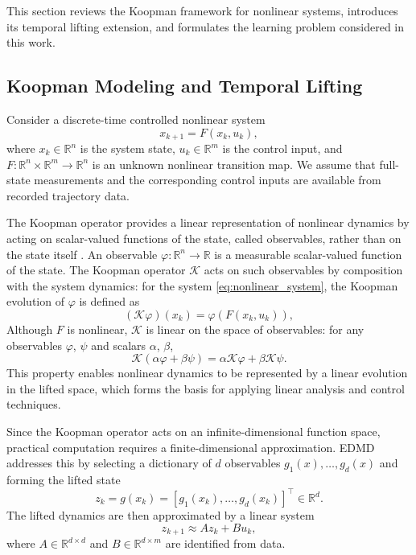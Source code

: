 \documentclass[journal]{IEEEtran}
\begin{document}
This section reviews the Koopman framework for nonlinear systems, introduces its temporal lifting extension, and formulates the learning problem considered in this work.

\subsection{Koopman Modeling and Temporal Lifting}
\label{sec:preliminary}

Consider a discrete-time controlled nonlinear system
\begin{equation}
    x_{k+1} = F(x_k, u_k),
    \label{eq:nonlinear_system}
\end{equation}
where $x_k \in \mathbb{R}^n$ is the system state, $u_k \in \mathbb{R}^m$ is the control input, and $F:\mathbb{R}^n \times \mathbb{R}^m \to \mathbb{R}^n$ is an unknown nonlinear transition map. We assume that full-state measurements and the corresponding control inputs are available from recorded trajectory data.

The Koopman operator provides a linear representation of nonlinear dynamics by acting on scalar-valued functions of the state, called observables, rather than on the state itself \cite{koopman1931hamiltonian, mezic2005spectral, rowley2009spectral, brunton2022modern}. An observable $\varphi:\mathbb{R}^n\to\mathbb{R}$ is a measurable scalar-valued function of the state. The Koopman operator $\mathcal{K}$ acts on such observables by composition with the system dynamics: for the system \eqref{eq:nonlinear_system}, the Koopman evolution of $\varphi$ is defined as
\begin{equation}
    (\mathcal{K}\varphi)(x_k) = \varphi(F(x_k,u_k)),
    \label{eq:koopman_operator}
\end{equation}
Although $F$ is nonlinear, $\mathcal{K}$ is linear on the space of observables: for any observables $\varphi$, $\psi$ and scalars $\alpha$, $\beta$,
\begin{equation}
    \mathcal{K}(\alpha \varphi + \beta \psi)
    = \alpha \mathcal{K}\varphi + \beta \mathcal{K}\psi.
    \label{eq:koopman_linearity}
\end{equation}
This property enables nonlinear dynamics to be represented by a linear evolution in the lifted space, which forms the basis for applying linear analysis and control techniques.

Since the Koopman operator acts on an infinite-dimensional function space, practical computation requires a finite-dimensional approximation. EDMD addresses this by selecting a dictionary of $d$ observables $g_1(x),\ldots,g_d(x)$ and forming the lifted state
\begin{equation}
    z_k = g(x_k) = [g_1(x_k), \ldots, g_d(x_k)]^\top \in \mathbb{R}^d.
    \label{eq:instantaneous_lifting}
\end{equation}
The lifted dynamics are then approximated by a linear system
\begin{equation}
    z_{k+1} \approx A z_k + B u_k,
    \label{eq:edmd_dynamics}
\end{equation}
where $A \in \mathbb{R}^{d \times d}$ and $B \in \mathbb{R}^{d \times m}$ are identified from data.
\end{document}
